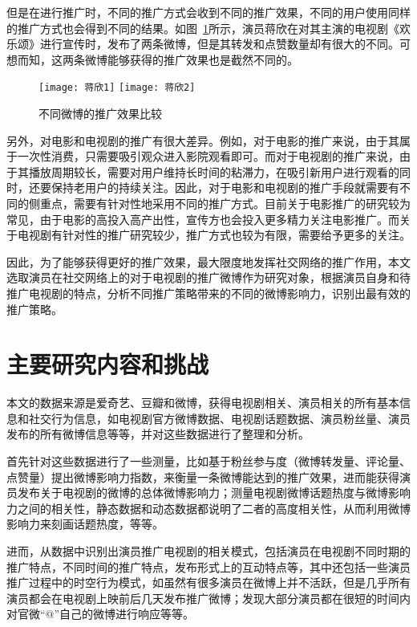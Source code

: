 但是在进行推广时，不同的推广方式会收到不同的推广效果，不同的用户使用同样的推广方式也会得到不同的结果。如图~\ref{蒋欣}所示，演员蒋欣在对其主演的电视剧《欢乐颂》进行宣传时，发布了两条微博，但是其转发和点赞数量却有很大的不同。可想而知，这两条微博能够获得的推广效果也是截然不同的。

\begin{figure}[h]
  \centering%
    {\texttt{[image: 蒋欣1]}}
      {\texttt{[image: 蒋欣2]}}
  \caption{不同微博的推广效果比较}
  \label{蒋欣}
\end{figure}

另外，对电影和电视剧的推广有很大差异。例如，对于电影的推广来说，由于其属于一次性消费，只需要吸引观众进入影院观看即可。而对于电视剧的推广来说，由于其播放周期较长，需要对用户维持长时间的粘滞力，在吸引新用户进行观看的同时，还要保持老用户的持续关注。因此，对于电影和电视剧的推广手段就需要有不同的侧重点，需要有针对性地采用不同的推广方式。目前关于电影推广的研究较为常见，由于电影的高投入高产出性，宣传方也会投入更多精力关注电影推广。而关于电视剧有针对性的推广研究较少，推广方式也较为有限，需要给予更多的关注。

因此，为了能够获得更好的推广效果，最大限度地发挥社交网络的推广作用，本文选取演员在社交网络上的对于电视剧的推广微博作为研究对象，根据演员自身和待推广电视剧的特点，分析不同推广策略带来的不同的微博影响力，识别出最有效的推广策略。

\section{主要研究内容和挑战}

本文的数据来源是爱奇艺、豆瓣和微博，获得电视剧相关、演员相关的所有基本信息和社交行为信息，如电视剧官方微博数据、电视剧话题数据、演员粉丝量、演员发布的所有微博信息等等，并对这些数据进行了整理和分析。

首先针对这些数据进行了一些测量，比如基于粉丝参与度（微博转发量、评论量、点赞量）提出微博影响力指数，来衡量一条微博能达到的推广效果，进而能获得演员发布关于电视剧的微博的总体微博影响力；测量电视剧微博话题热度与微博影响力之间的相关性，静态数据和动态数据都说明了二者的高度相关性，从而利用微博影响力来刻画话题热度，等等。

进而，从数据中识别出演员推广电视剧的相关模式，包括演员在电视剧不同时期的推广特点，不同时间的推广特点，发布形式上的互动特点等，其中还包括一些演员推广过程中的时空行为模式，如虽然有很多演员在微博上并不活跃，但是几乎所有演员都会在电视剧上映前后几天发布推广微博；发现大部分演员都在很短的时间内对官微“@”自己的微博进行响应等等。

